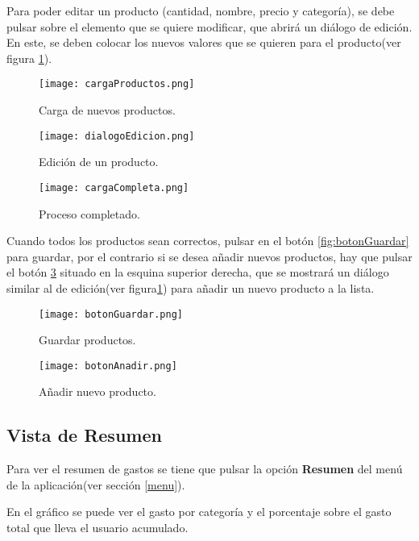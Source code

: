 Para poder editar un producto (cantidad, nombre, precio y categoría), se debe pulsar sobre el elemento que se quiere modificar, que abrirá un diálogo de edición. En este, se deben colocar los nuevos valores que se quieren para el producto(ver figura \ref{fig:dialogoEdicion}).

\begin{figure}[ht]
  \texttt{[image: cargaProductos.png]}
  \caption{Carga de nuevos productos.}\label{fig:cargaProductos}
\endminipage\hfill
{}
  \texttt{[image: dialogoEdicion.png]}
  \caption{Edición de un producto.}\label{fig:dialogoEdicion}
\endminipage
\end{figure}
\begin{figure}[ht]
\begin{center}
%
  \texttt{[image: cargaCompleta.png]}
  \caption{Proceso completado.}\label{fig:cargaCompleta}
\endminipage
\end{center} 
\end{figure}
\cleardoublepage
Cuando todos los productos sean correctos, pulsar en el botón \ref{fig:botonGuardar} para guardar, por el contrario si se desea añadir nuevos productos, hay que pulsar el botón \ref{fig:botonAnadir} situado en la esquina superior derecha, que se mostrará un diálogo similar al de edición(ver figura\ref{fig:dialogoEdicion}) para añadir un nuevo producto a la lista.

\begin{figure}[ht]
\begin{center} 
  \texttt{[image: botonGuardar.png]}
  \caption{Guardar productos.}\label{fig:botonGuardar}
\endminipage\hfil
{}
  \texttt{[image: botonAnadir.png]}
  \caption{Añadir nuevo producto.}\label{fig:botonAnadir}
\endminipage
\end{center}
\end{figure}

\subsection{Vista de Resumen \label{resumen}}

Para ver el resumen de gastos se tiene  que pulsar la opción \textbf{Resumen} del menú de la aplicación(ver sección \ref{menu}).

En el gráfico se puede ver el gasto por categoría y el porcentaje sobre el gasto total que lleva el usuario acumulado.

